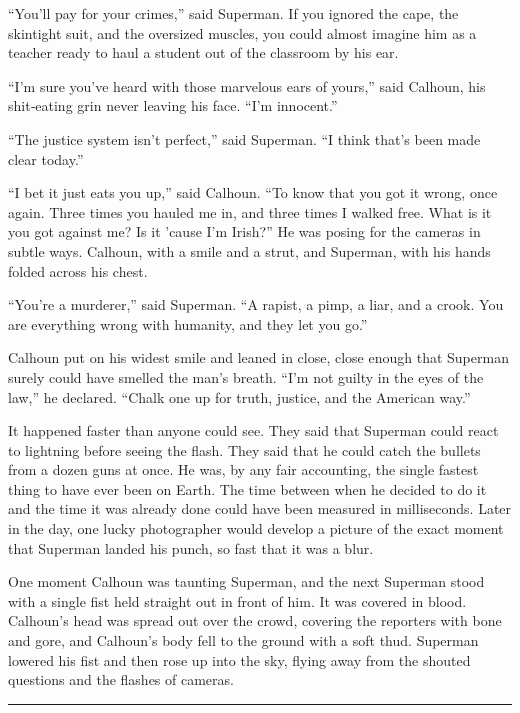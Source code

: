 \documentclass[ebook,12pt]{memoir}
\begin{document}
``You'll pay for your crimes,'' said Superman. If you ignored the cape,
the skintight suit, and the oversized muscles, you could almost imagine
him as a teacher ready to haul a student out of the classroom by his
ear.

``I'm sure you've heard with those marvelous ears of yours,'' said
Calhoun, his shit‐eating grin never leaving his face. ``I'm innocent.''

``The justice system isn't perfect,'' said Superman. ``I think that's
been made clear today.''

``I bet it just eats you up,'' said Calhoun. ``To know that you got it
wrong, once again. Three times you hauled me in, and three times I
walked free. What is it you got against me? Is it 'cause I'm Irish?'' He
was posing for the cameras in subtle ways. Calhoun, with a smile and a
strut, and Superman, with his hands folded across his chest.

``You're a murderer,'' said Superman. ``A rapist, a pimp, a liar, and a
crook. You are everything wrong with humanity, and they let you go.''

Calhoun put on his widest smile and leaned in close, close enough that
Superman surely could have smelled the man's breath. ``I'm not guilty in
the eyes of the law,'' he declared. ``Chalk one up for truth, justice,
and the American way.''

It happened faster than anyone could see. They said that Superman could
react to lightning before seeing the flash. They said that he could
catch the bullets from a dozen guns at once. He was, by any fair
accounting, the single fastest thing to have ever been on Earth. The
time between when he decided to do it and the time it was already done
could have been measured in milliseconds. Later in the day, one lucky
photographer would develop a picture of the exact moment that Superman
landed his punch, so fast that it was a blur.

One moment Calhoun was taunting Superman, and the next Superman stood
with a single fist held straight out in front of him. It was covered in
blood. Calhoun's head was spread out over the crowd, covering the
reporters with bone and gore, and Calhoun's body fell to the ground with
a soft thud. Superman lowered his fist and then rose up into the sky,
flying away from the shouted questions and the flashes of cameras.

\begin{center}\rule{0.5\linewidth}{\linethickness}\end{center}
\end{document}
